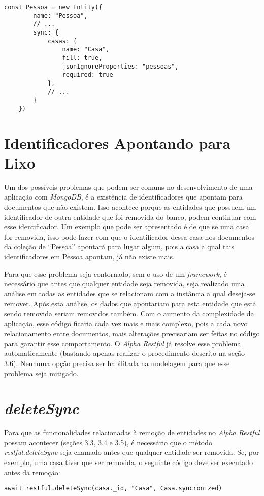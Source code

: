 \begin{lstlisting}[style=ES6, caption={Modelagem de Pessoa com \textit{required}}]
    const Pessoa = new Entity({
        name: "Pessoa",
        // ...
        sync: {
            casas: {
                name: "Casa",
                fill: true,
                jsonIgnoreProperties: "pessoas",
                required: true
            },
            // ...
        }
    })
\end{lstlisting}

\section{Identificadores Apontando para Lixo}

Um dos possíveis problemas que podem ser comuns no desenvolvimento de uma aplicação com \textit{MongoDB}, é a existência de identificadores que apontam para documentos que não existem. Isso acontece porque as entidades que possuem um identificador de outra entidade que foi removida do banco, podem continuar com esse identificador. Um exemplo que pode ser apresentado é de que se uma casa for removida, isso pode fazer com que o identificador dessa casa nos documentos da coleção de ``Pessoa'' apontará para lugar algum, pois a casa a qual tais identificadores em Pessoa apontam, já não existe mais.
    
Para que esse problema seja contornado, sem o uso de um \textit{framework}, é necessário que antes que qualquer entidade seja removida, seja realizado uma análise em todas as entidades que se relacionam com a instância a qual deseja-se remover. Após esta análise, os dados que apontariam para esta entidade que está sendo removida seriam removidos também. Com o aumento da complexidade da aplicação, esse código ficaria cada vez mais e mais complexo, pois a cada novo relacionamento entre documentos, mais alterações precisariam ser feitas no código para garantir esse comportamento. O \textit{Alpha Restful} já resolve esse problema automaticamente (bastando apenas realizar o procedimento descrito na seção 3.6). Nenhuma opção precisa ser habilitada na modelagem para que esse problema seja mitigado.

\section{\textit{deleteSync}}

Para que as funcionalidades relacionadas à remoção de entidades no \textit{Alpha Restful} possam acontecer (seções 3.3, 3.4 e 3.5), é necessário que o método \textit{restful.deleteSync} seja chamado antes que qualquer entidade ser removida. Se, por exemplo, uma casa tiver que ser removida, o seguinte código deve ser executado antes da remoção:

\begin{lstlisting}[style=ES6, caption={Antes de Remover Uma Casa}]
  await restful.deleteSync(casa._id, "Casa", Casa.syncronized)
\end{lstlisting}